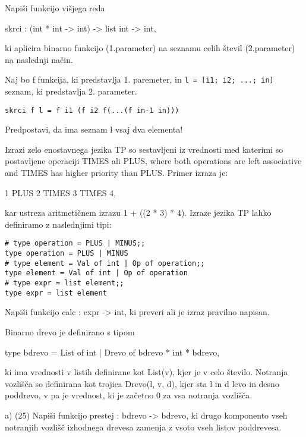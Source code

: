 \begin{ex}
\end{ex} \begin{ex}
Napi\v si funkcijo vi\v sjega reda 

skrci : (int * int -> int) -> list int -> int, 

ki aplicira binarno funkcijo (1.parameter) na seznamu celih \v stevil (2.parameter) na naslednji na\v cin. 

Naj bo f funkcija, ki predstavlja 1. paremeter, in 
\texttt{l = [i1; i2; ...; in] }
seznam, ki predstavlja 2. parameter. 
\begin{verbatim}
skrci f l = f i1 (f i2 f(...(f in-1 in)))
\end{verbatim}

Predpostavi, da ima seznam l vsaj dva elementa!  


\end{ex} \begin{ex}
Izrazi zelo enostavnega jezika TP so sestavljeni iz vrednosti med katerimi so postavljene operaciji TIMES ali PLUS, where both operations are left associative and TIMES has higher priority than PLUS. Primer izraza je:

1 PLUS 2 TIMES 3 TIMES 4,

kar ustreza aritmeti\v cnem izrazu 1 + ((2 * 3) * 4). Izraze jezika TP lahko definiramo z naslednjimi tipi:
 
\begin{verbatim}
# type operation = PLUS | MINUS;; 
type operation = PLUS | MINUS 
# type element = Val of int | Op of operation;; 
type element = Val of int | Op of operation
# type expr = list element;;
type expr = list element

\end{verbatim}
Napi\v si funkcijo calc : expr -> int, ki preveri ali je izraz pravilno napisan. 


\end{ex} \begin{ex}
Binarno drevo je definirano s tipom

type bdrevo = List of int | Drevo of bdrevo * int * bdrevo,

ki ima vrednosti v listih definirane kot List(v), kjer je v celo \v stevilo.  Notranja vozli\v s\v ca so definirana kot trojica Drevo(l, v, d), kjer sta l in d levo in desno poddrevo, v pa je vrednost, ki je za\v cetno 0 za vsa notranja vozli\v s\v ca.

a) (25) Napi\v si funkcijo prestej : bdrevo -> bdrevo, ki drugo komponento vseh notranjih vozli\v s\v c izhodnega drevesa zamenja z vsoto vseh listov poddrevesa.


\end{ex}
